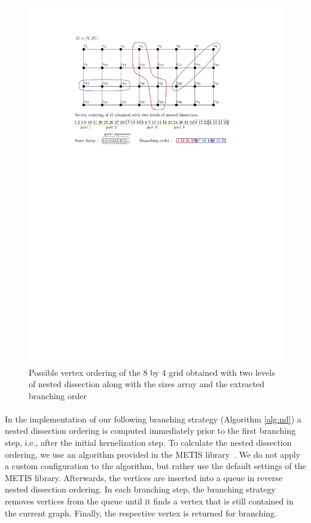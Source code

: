 \documentclass[12pt,a4paper,twoside]{scrartcl}
\numberwithin{equation}{section}
\begin{document}
\begin{figure}[ht]
	\includegraphics[scale=1.1]{images/restricted_nd}
	\centering
	\caption{Possible vertex ordering of the $8$ by $4$ grid obtained with two levels of nested dissection along with the sizes array and the extracted branching order}
	\label{fig:nd}
\end{figure}

\paragraph{}
In the implementation of our following branching strategy (Algorithm \ref{alg:nd}) a nested dissection ordering is computed immediately prior to the first branching step, i.e., after the initial kernelization step. To calculate the nested dissection ordering, we use an algorithm provided in the METIS library~\cite{METIS}. We do not apply a custom configuration to the algorithm, but rather use the default settings of the METIS library. Afterwards, the vertices are inserted into a queue in reverse nested dissection ordering. In each branching step, the branching strategy removes vertices from the queue until it finds a vertex that is still contained in the current graph. Finally, the respective vertex is returned for branching.
\end{document}
